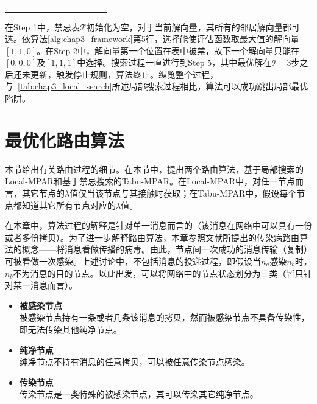 \begin{table}[hbt]
{\begin{tabular}{|c|c|c|c|c|c|c|c|c|c|c|c|}
    \multicolumn{1}{|c|}{}
    &\multicolumn{1}{c|}{}
    &\multicolumn{1}{c|}{}
    &\multicolumn{1}{c|}{}
    &\multicolumn{1}{c|}{}
    &\multicolumn{1}{c|}{}
    &\multicolumn{1}{c|}{}
    &\multicolumn{1}{c|}{}
    & &  &  &
    \\
    
    \multicolumn{1}{|c|}{}
    &\multicolumn{1}{c|}{}
    &\multicolumn{1}{c|}{}
    &\multicolumn{1}{c|}{}
    &\multicolumn{1}{c|}{}
    &\multicolumn{1}{c|}{}
    &\multicolumn{1}{c|}{}
    &\multicolumn{1}{c|}{}
    & &  &  &
    \\    
    \hline    
  \end{tabular}}
  \label{tab:chap3_tabu_search}
\end{table}

在Step 1中，禁忌表$\mathcal{T}$初始化为空，对于当前解向量，其所有的邻居解向量都可选。依算法\ref{alg:chap3_framework}第5行，选择能使评估函数取最大值的解向量$[1,1,0]$。在Step 2中，解向量第一个位置在表中被禁，故下一个解向量只能在$[0,0,0]$及$[1,1,1]$中选择。搜索过程一直进行到Step 5，其中最优解在$\theta=3$步之后还未更新，触发停止规则，算法终止。纵览整个过程，与\tablename~\ref{tab:chap3_local_search}所述局部搜索过程相比，算法可以成功跳出局部最优陷阱。

\section{最优化路由算法}
\label{chap3:最优化路由算法}

本节给出有关路由过程的细节。在本节中，提出两个路由算法，基于局部搜索的Local-MPAR和基于禁忌搜索的Tabu-MPAR。在Local-MPAR中，对任一节点而言，其它节点的$\lambda$值仅当该节点与其接触时获取；在Tabu-MPAR中，假设每个节点都知道其它所有节点对应的$\lambda$值。

在本章中，算法过程的解释是针对单一消息而言的（该消息在网络中可以具有一份或者多份拷贝）。为了进一步解释路由算法，本章参照文献所提出的传染病路由算法的概念——将消息看做传播的病毒。由此，节点间一次成功的消息传输（复制）可被看做一次感染。上述讨论中，不包括消息的投递过程，即假设当$n_a$感染$n_b$时，$n_b$不为消息的目的节点。以此出发，可以将网络中的节点状态划分为三类（皆只针对某一消息而言）。

\begin{itemize}
\item \textbf{被感染节点}\\
被感染节点持有一条或者几条该消息的拷贝，然而被感染节点不具备传染性，即无法传染其他纯净节点。

\item \textbf{纯净节点}\\
纯净节点不持有消息的任意拷贝，可以被任意传染节点感染。

\item \textbf{传染节点}\\
传染节点是一类特殊的被感染节点，其可以传染其它纯净节点。
\end{itemize}

